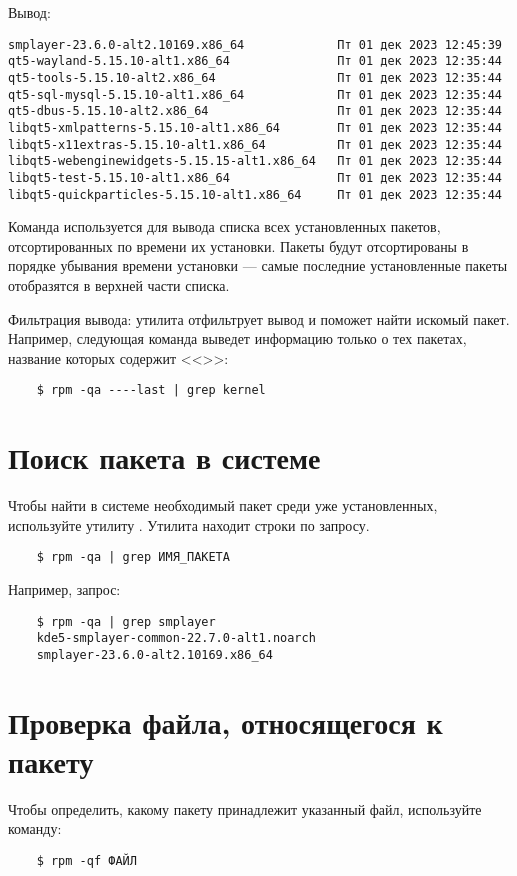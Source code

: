 Вывод:
\begin{verbatim}
smplayer-23.6.0-alt2.10169.x86_64             Пт 01 дек 2023 12:45:39
qt5-wayland-5.15.10-alt1.x86_64               Пт 01 дек 2023 12:35:44
qt5-tools-5.15.10-alt2.x86_64                 Пт 01 дек 2023 12:35:44
qt5-sql-mysql-5.15.10-alt1.x86_64             Пт 01 дек 2023 12:35:44
qt5-dbus-5.15.10-alt2.x86_64                  Пт 01 дек 2023 12:35:44
libqt5-xmlpatterns-5.15.10-alt1.x86_64        Пт 01 дек 2023 12:35:44
libqt5-x11extras-5.15.10-alt1.x86_64          Пт 01 дек 2023 12:35:44
libqt5-webenginewidgets-5.15.15-alt1.x86_64   Пт 01 дек 2023 12:35:44
libqt5-test-5.15.10-alt1.x86_64               Пт 01 дек 2023 12:35:44
libqt5-quickparticles-5.15.10-alt1.x86_64     Пт 01 дек 2023 12:35:44
\end{verbatim}

Команда  используется для вывода списка всех установленных пакетов, отсортированных
по времени их установки. Пакеты будут отсортированы в порядке убывания времени установки --- самые
последние установленные пакеты отобразятся в верхней части списка.

Фильтрация вывода: утилита  отфильтрует вывод и поможет найти искомый пакет. Например,
следующая команда выведет информацию только о тех пакетах, название которых содержит <<>>:

\begin{verbatim}
    $ rpm -qa ----last | grep kernel
\end{verbatim}

\section{Поиск пакета в системе}
Чтобы найти в системе необходимый пакет среди уже установленных, используйте утилиту . Утилита  находит строки по запросу.
\begin{verbatim}
    $ rpm -qa | grep ИМЯ_ПАКЕТА
\end{verbatim}

Например, запрос:
\begin{verbatim}
    $ rpm -qa | grep smplayer
    kde5-smplayer-common-22.7.0-alt1.noarch
    smplayer-23.6.0-alt2.10169.x86_64
\end{verbatim}

\section{Проверка файла, относящегося к пакету}
Чтобы определить, какому пакету принадлежит указанный файл, используйте команду:
\begin{verbatim}
    $ rpm -qf ФАЙЛ
\end{verbatim}


